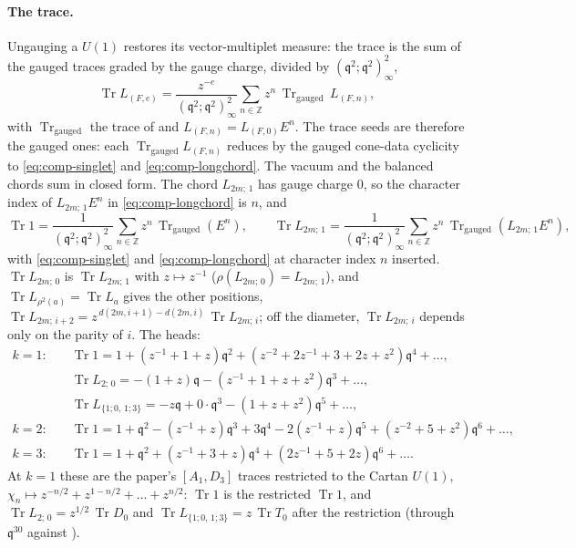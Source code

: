\documentclass[11pt]{amsart}
\makeatletter
\DeclareMathOperator{\Tr}{Tr}
\newcommand\fq{\mathfrak{q}}
\newcommand\bZ{\mathbb{Z}}
\theoremstyle{remark}
\newcommand{\peqref}[1]{\@ifundefined{r@P-#1}{\textup{[\texttt{\detokenize{#1}}]}}{\eqref{P-#1}}}
\makeatother
\begin{document}
\paragraph{The trace.}  Ungauging a $U(1)$ restores its vector-multiplet
measure: the trace is the sum of the gauged traces graded by the gauge charge,
divided by $(\fq^2;\fq^2)_\infty^2$,
\begin{equation}\label{eq:comp-aodd-trace}
  \Tr L_{(F,e)}=\frac{z^{-e}}{(\fq^2;\fq^2)_\infty^{2}}\sum_{n\in\bZ}z^{n}\,
  \Tr_{\mathrm{gauged}}\,L_{(F,n)},
\end{equation}
with $\Tr_{\mathrm{gauged}}$ the trace of  and
$L_{(F,n)}=L_{(F,0)}E^{n}$.  The trace seeds are therefore the gauged ones:
each $\Tr_{\mathrm{gauged}}L_{(F,n)}$ reduces by the gauged cone-data
cyclicity to \eqref{eq:comp-singlet} and \eqref{eq:comp-longchord}.  The vacuum
and the balanced chords sum in closed form.  The chord $L_{2m;\,1}$ has gauge
charge $0$, so the character index of $L_{2m;\,1}E^{n}$ in
\eqref{eq:comp-longchord} is $n$, and
\begin{equation}\label{eq:comp-aodd-closed}
  \Tr1=\frac{1}{(\fq^2;\fq^2)_\infty^{2}}\sum_{n\in\bZ}z^{n}\,\Tr_{\mathrm{gauged}}(E^{n}),\qquad
  \Tr L_{2m;\,1}=\frac{1}{(\fq^2;\fq^2)_\infty^{2}}\sum_{n\in\bZ}z^{n}\,
  \Tr_{\mathrm{gauged}}(L_{2m;\,1}E^{n}),
\end{equation}
with \eqref{eq:comp-singlet} and \eqref{eq:comp-longchord} at character index
$n$ inserted.  $\Tr L_{2m;\,0}$ is $\Tr L_{2m;\,1}$ with $z\mapsto z^{-1}$
($\rho(L_{2m;\,0})=L_{2m;\,1}$), and $\Tr L_{\rho^2(a)}=\Tr L_a$ gives the other
positions, $\Tr L_{2m;\,i+2}=z^{\,d(2m,i+1)-d(2m,i)}\,\Tr L_{2m;\,i}$; off the
diameter, $\Tr L_{2m;\,i}$ depends only on the parity of $i$.  The heads:
\begin{equation}\label{eq:comp-aodd-heads}
\begin{aligned}
  k=1:&\quad \Tr1=1+(z^{-1}+1+z)\fq^2+(z^{-2}+2z^{-1}+3+2z+z^2)\fq^4+\dots,\\
  &\quad \Tr L_{2;\,0}=-(1+z)\fq-(z^{-1}+1+z+z^2)\fq^3+\dots,\\
  &\quad \Tr L_{\{1;0,\,1;3\}}=-z\fq+0\cdot\fq^3-(1+z+z^2)\fq^5+\dots,\\
  k=2:&\quad \Tr1=1+\fq^2-(z^{-1}+z)\fq^3+3\fq^4-2(z^{-1}+z)\fq^5+(z^{-2}+5+z^2)\fq^6+\dots,\\
  k=3:&\quad \Tr1=1+\fq^2+(z^{-1}+3+z)\fq^4+(2z^{-1}+5+2z)\fq^6+\dots.
\end{aligned}
\end{equation}
At $k=1$ these are the paper's $[A_1,D_3]$ traces \peqref{eq:a1d3trace}
restricted to the Cartan $U(1)$, $\chi_n\mapsto z^{-n/2}+z^{1-n/2}+\dots+z^{n/2}$:
$\Tr1$ is the restricted $\Tr1$, and $\Tr L_{2;\,0}=z^{1/2}\,\Tr D_0$ and
$\Tr L_{\{1;0,\,1;3\}}=z\,\Tr T_0$ after the restriction (through $\fq^{30}$
against ).
\end{document}
